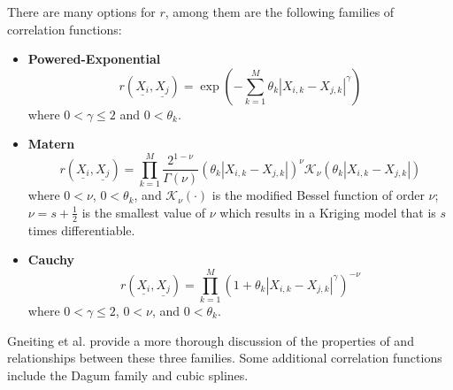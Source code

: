 There are many options for $r$, among them are the following 
families of correlation functions:
\begin{itemize}
\item {\bf Powered-Exponential}
      \begin{equation}
        r\left(\underline{X_i},\underline{X_j}\right)=\exp\left(-\sum_{k=1}^M \theta_k\left|X_{i,k}-X_{j,k}\right|^\gamma\right)
        \label{Eqn:PowExpCorrFunc}
      \end{equation}
      where $0<\gamma\le2$ and $0<\theta_k$.
\item {\bf Matern}
      \begin{displaymath}
        r\left(\underline{X_i},\underline{X_j}\right)=\prod_{k=1}^M \frac{2^{1-\nu}}{\Gamma(\nu)}\left(\theta_k\left|X_{i,k}-X_{j,k}\right|\right)^\nu\mathcal{K}_\nu\left(\theta_k\left|X_{i,k}-X_{j,k}\right|\right)
      \end{displaymath}
      where $0<\nu$, $0<\theta_k$, and $\mathcal{K}_\nu(\cdot)$ is the 
      modified Bessel function of order $\nu$; $\nu=s+\frac{1}{2}$ is  
      the smallest value of $\nu$ which results in a Kriging model that 
      is $s$ times differentiable. 
\item {\bf Cauchy}
      \begin{displaymath}
        r\left(\underline{X_i},\underline{X_j}\right)=\prod_{k=1}^M \left(1+\theta_k\left|X_{i,k}-X_{j,k}\right|^\gamma\right)^{-\nu}
      \end{displaymath}
      where $0<\gamma\le2$, $0<\nu$, and $0<\theta_k$.
\end{itemize}
Gneiting et al. \cite{Gne07} provide a more 
thorough discussion of the properties of and relationships between these
three families.  Some additional correlation functions include the 
Dagum family \cite{Ber08} and cubic splines.\newline

